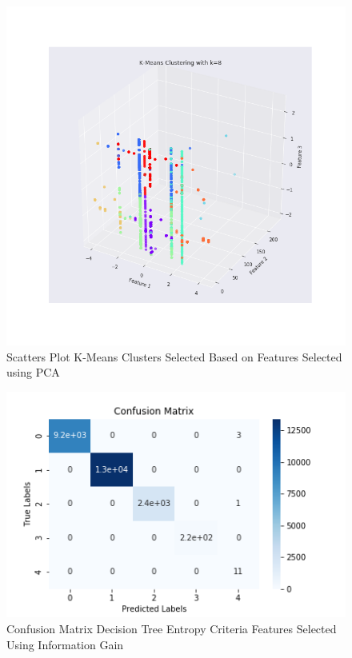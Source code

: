 \documentclass{article}
\begin{document}
\begin{figure}[htbp]
\centering
\includegraphics[scale=0.5]{figures/kmeans_cluster_1.png}
\caption{Scatters Plot K-Means Clusters Selected Based on Features Selected using PCA}
\label{fig:PCA_Cluters}
\end{figure}

\begin{figure}[htbp]
\centering
\includegraphics[scale=0.5]{figures/cm_dt_ig_entropy.png}
\caption{Confusion Matrix Decision Tree Entropy Criteria Features Selected Using Information Gain}
\label{fig:dt_cm_entrop_ig}
\end{figure}
\end{document}
